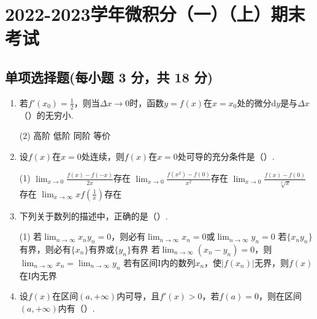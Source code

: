 \documentclass[../Main.tex]{subfiles}
\begin{document}
\chapter{2022-2023学年微积分（一）（上）期末考试}

\section{单项选择题(每小题 3 分，共 18 分)}
\begin{enumerate}
    \item 若$f'(x_{0})=\frac{1}{2}$，则当$\Delta x\to0$时，函数$y=f(x)$在$x=x_{0}$处的微分$\mathrm{d}
              y$是与$\Delta x$（\qquad）的无穷小.

          \begin{tasks}[label=\textbf{\Alph*.}, label-width=1.5em, column-sep=1em](2)
              \task 高阶
              \task 低阶
              \task 同阶
              \task 等价
          \end{tasks}

    \item 设$f(x)$在$x=0$处连续，则$f(x)$在$x=0$处可导的充分条件是（\qquad）.

          \begin{tasks}[label=\textbf{\Alph*.}, label-width=1.5em, column-sep=1em](1)
              \task $\lim_{x\to0}\frac{f(x)-f(-x)}{2x}$存在
              \task $\lim_{x\to0}\frac{f(x^{2})-f(0)}{x^{2}}$存在
              \task $\lim_{x\to0}\frac{f(x)-f(0)}{\sqrt[3]{x}}$存在
              \task $\lim_{x\to\infty}x f\left(\frac{1}{x}\right)$存在
          \end{tasks}

    \item 下列关于数列的描述中，正确的是（\qquad）.

          \begin{tasks}[label=\textbf{\Alph*.}, label-width=1.5em, column-sep=1em](1)
              \task 若$\lim_{n\to\infty}x_{n} y_{n}=0$，则必有$\lim_{n\to\infty}x_{n}=0$或$\lim_{n\to\infty}y_{n}=0$
              \task 若$\{x_{n} y_{n}\}$有界，则必有$\{x_{n}\}$有界或$\{y_{n}\}$有界
              \task 若$\lim_{n\to\infty}(x_{n}-y_{n})=0$，则$\lim_{n\to\infty}x_{n}=\lim_{n\to\infty}y_{n}$
              \task 若有区间$\mathrm{I}$内的数列$x_{n}$，使$|f(x_{n})|$无界，则$f(x)$在$\mathrm{I}$内无界
          \end{tasks}

    \item 设$f(x)$在区间$(a,+\infty)$内可导，且$f'(x)>0$，若$f(a)=0$，则在区间$(a
              ,+\infty)$内有（\qquad）.


\end{enumerate}
\end{document}
